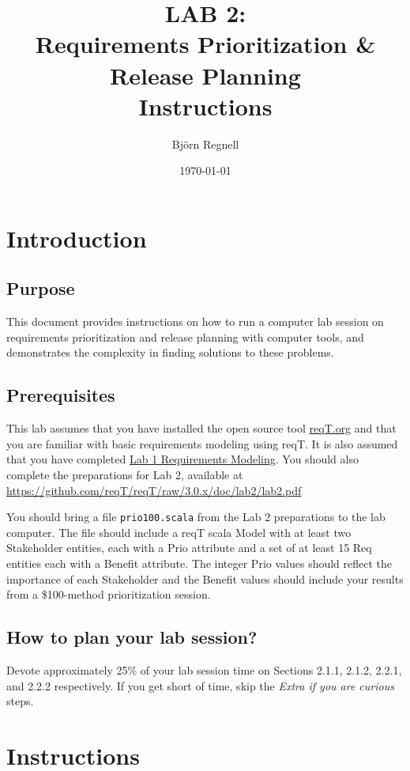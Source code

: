 \documentclass[11pt]{article}
\title{{\bf LAB 2:\\Requirements Prioritization \& Release Planning}\\ Instructions
}
\author{Björn Regnell}
\date{\today}
\begin{document}
\maketitle

\section{Introduction}

\subsection{Purpose} This document provides instructions on how to run 
a computer lab session on requirements prioritization and release planning with computer tools, and demonstrates the complexity in finding solutions to these problems.  

\subsection{Prerequisites} This lab assumes that you have installed the open source tool \href{http://reqT.org}{reqT.org} and that you are familiar with basic requirements modeling using reqT. It is also assumed that you have completed \href{https://github.com/reqT/reqT/raw/3.0.x/doc/lab1/lab1.pdf}{Lab 1 Requirements Modeling}. You should also complete the preparations for Lab 2, available at \url{https://github.com/reqT/reqT/raw/3.0.x/doc/lab2/lab2.pdf} 

You should bring a file \verb+prio100.scala+ from the Lab 2 preparations to the lab computer. The file should include a reqT scala Model with at least two Stakeholder entities, each with a Prio attribute and a set of at least 15 Req entities each with a Benefit attribute. The integer Prio values should reflect the importance of each Stakeholder and the Benefit values should include your results from a \$100-method prioritization session.  

\subsection{How to plan your lab session?}
Devote approximately 25\% of your lab session time on Sections 2.1.1, 2.1.2, 2.2.1, and 2.2.2 respectively. If you get short of time, skip the {\it Extra if you are curious} steps.

\clearpage\newpage
\section{Instructions}\label{section:instr}
\end{document}
